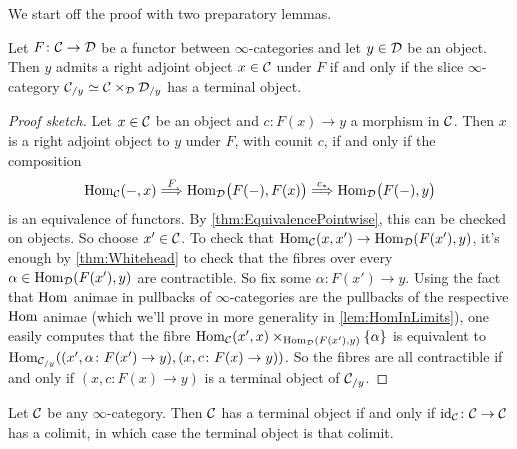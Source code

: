 We start off the proof with two preparatory lemmas.
\begin{lem}\label{lem:TerminalInSlice}
	Let $F\colon \mathcal{C}\rightarrow\mathcal{D}$ be a functor between $\infty$-categories and let $y\in\mathcal{D}$ be an object. Then $y$ admits a right adjoint object $x\in\mathcal{C}$ under $F$ if and only if the slice $\infty$-category $\mathcal{C}_{/y}\simeq \mathcal{C}\times_{\mathcal{D}}\mathcal{D}_{/y}$ has a terminal object.
\end{lem}
\begin{proof}[Proof sketch]
	Let $x\in \mathcal{C}$ be an object and $c\colon F(x)\rightarrow y$ a morphism in $\mathcal{C}$. Then $x$ is a right adjoint object to $y$ under $F$, with counit $c$, if and only if the composition
	\begin{equation*}
		\Hom_\Cc\!\left(-,x\right)\overset{F}{\Longrightarrow} \Hom_\Dd\lef(F(-),F(x)\righ)\overset{c_*}{\Longrightarrow}\Hom_\Dd\lef(F(-),y\righ)
	\end{equation*}
	is an equivalence of functors. By \cref{thm:EquivalencePointwise}, this can be checked on objects. So choose $x'\in\mathcal{C}$. To check that $\operatorname{Hom}_{\mathcal{C}}(x,x')\rightarrow \operatorname{Hom}_{\mathcal{D}}(F(x'),y)$, it's enough by \cref{thm:Whitehead} to check that the fibres over every $\alpha\in\operatorname{Hom}_{\mathcal{D}}(F(x'),y)$ are contractible. So fix some $\alpha\colon F(x')\rightarrow y$. Using the fact that $\operatorname{Hom}$ animae in pullbacks of $\infty$-categories are the pullbacks of the respective $\operatorname{Hom}$ animae (which we'll prove in more generality in \cref{lem:HomInLimits}), one easily computes that the fibre $\operatorname{Hom}_{\mathcal{C}}(x',x)\times_{\operatorname{Hom}_{\mathcal{D}}(F(x'),y)}\{\alpha\}$ is equivalent to $\Hom_{\Cc_{/y}}\lef((x',\alpha\colon F(x')\rightarrow y),(x,c\colon F(x)\rightarrow y)\righ)$. So the fibres are all contractible if and only if $(x,c\colon F(x)\rightarrow y)$ is a terminal object of $\mathcal{C}_{/y}$.
\end{proof}
\begin{lem}\label{lem:TerminalObjectColimit}
	Let $\mathcal{C}$ be any  $\infty$-category. Then $\mathcal{C}$ has a terminal object if and only if $\operatorname{id}_{\mathcal{C}}\colon \mathcal{C}\rightarrow\mathcal{C}$ has a colimit, in which case the terminal object is that colimit.
\end{lem}
